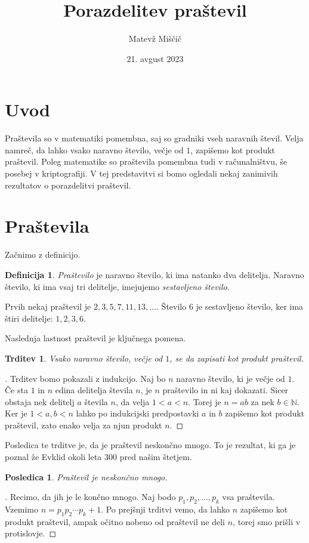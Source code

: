 \documentclass[a4paper,12pt]{article}
\title{Porazdelitev praštevil}
\author{Matevž Miščič}
\date{21. avgust 2023}
\def\N{\mathbb{N}}
\theoremstyle{definition}
\newtheorem{definicija}{Definicija}
\theoremstyle{plain}
\newtheorem{trditev}{Trditev}
\newtheorem{posledica}{Posledica}
\newenvironment{dokaz}{\begin{proof}[\bfseries\upshape\proofname]}{\end{proof}}
\begin{document}
\maketitle{}

\section{Uvod}
Praštevila so v matematiki pomembna, saj so gradniki vseh naravnih števil. Velja namreč, da lahko vsako naravno število, večje od $1$, zapišemo kot produkt praštevil. Poleg matematike so praštevila pomembna tudi v računalništvu, še posebej v kriptografiji. V tej predstavitvi si bomo ogledali nekaj zanimivih rezultatov o porazdelitvi praštevil.



\section{Praštevila}

Začnimo z definicijo.

\begin{definicija}
    \emph{Praštevilo} je naravno število, ki ima natanko dva delitelja.
    Naravno število, ki ima vsaj tri delitelje, imejujemo \emph{sestavljeno število}.
\end{definicija}
Prvih nekaj praštevil je $2, 3, 5, 7, 11, 13, \ldots$. Število $6$ je sestavljeno število, ker ima štiri delitelje: $1, 2, 3, 6$.

Naslednja lastnost praštevil je ključnega pomena.

\begin{trditev}
    \label{factorisation}
    Vsako naravno število, večje od $1$, se da zapisati kot produkt praštevil.
\end{trditev}
\begin{dokaz}
    Trditev bomo pokazali z indukcijo. Naj bo $n$ naravno število, ki je večje od $1$. Če sta $1$ in $n$ edina delitelja števila $n$, je $n$ praštevilo in ni kaj dokazati. Sicer obstaja nek delitelj $a$ števila $n$, da velja $1 < a < n$. Torej je $n = ab$ za nek $b \in \N$. Ker je $1 < a, b < n$ lahko po indukcijski predpostavki $a$ in $b$ zapišemo kot produkt praštevil, zato enako velja za njun produkt $n$.
\end{dokaz}

Posledica te trditve je, da je praštevil neskončno mnogo. To je rezultat, ki ga je poznal že Evklid okoli leta 300 pred našim štetjem.

\begin{posledica}
    Praštevil je neskončno mnogo.
\end{posledica}
\begin{dokaz}
    Recimo, da jih je le končno mnogo. Naj bodo $p_1, p_2, \ldots, p_k$ vsa praštevila. Vzemimo $n = p_1p_2 \cdots p_k + 1$. Po prejšnji trditvi vemo, da lahko $n$ zapišemo kot produkt praštevil, ampak očitno nobeno od praštevil ne deli $n$, torej smo prišli v protislovje.
\end{dokaz}
\end{document}
